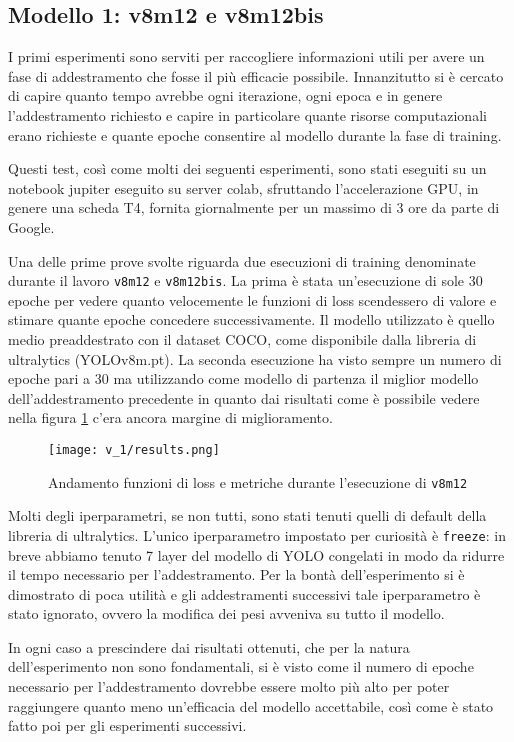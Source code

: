 \subsection*{Modello 1: v8m12 e v8m12bis}

I primi esperimenti sono serviti per raccogliere informazioni utili per avere un fase di 
addestramento che fosse il più efficacie possibile. Innanzitutto si è cercato di capire quanto
tempo avrebbe ogni iterazione, ogni epoca e in genere l'addestramento richiesto e capire 
in particolare quante risorse computazionali erano richieste e quante epoche consentire
al modello durante la fase di training.

Questi test, così come molti dei seguenti esperimenti, sono stati eseguiti su un notebook
jupiter eseguito su server colab, sfruttando l'accelerazione GPU, in genere una scheda T4, 
fornita giornalmente per un massimo di 3 ore da parte di Google.


Una delle prime prove svolte riguarda due esecuzioni di training denominate durante il lavoro
\verb+v8m12+ e \verb+v8m12bis+. La prima è stata un'esecuzione di sole 30 epoche per vedere quanto 
velocemente le funzioni di loss scendessero di valore e stimare quante epoche concedere successivamente.
Il modello utilizzato è quello medio preaddestrato con il dataset COCO, come disponibile dalla libreria 
di ultralytics (YOLOv8m.pt).
La seconda esecuzione ha visto sempre un numero di epoche pari a 30 ma utilizzando come modello di
partenza il miglior modello dell'addestramento precedente in quanto dai risultati come è possibile vedere 
nella figura \ref{fig:v1-1} c'era ancora margine di miglioramento.

\begin{figure}[h]
    \centering
    \texttt{[image: v\_1/results.png]}
    \caption{Andamento funzioni di loss e metriche durante l'esecuzione di \texttt{v8m12}}
    \label{fig:v1-1}
    \end{figure}

Molti degli iperparametri, se non tutti, sono stati tenuti quelli di default della libreria di ultralytics.
L'unico iperparametro impostato per curiosità è \verb|freeze|: in breve abbiamo tenuto 7 layer del modello 
di YOLO congelati in modo da ridurre il tempo necessario per l'addestramento. Per la bontà dell'esperimento
si è dimostrato di poca utilità e gli addestramenti successivi tale iperparametro è stato ignorato, 
ovvero la modifica dei pesi avveniva su tutto il modello.



In ogni caso a prescindere dai risultati ottenuti, che per la natura dell'esperimento non sono
fondamentali, si è visto come il numero di epoche necessario per 
l'addestramento dovrebbe essere molto più alto per poter raggiungere quanto meno un'efficacia del modello
accettabile, così come è stato fatto poi per gli esperimenti successivi.